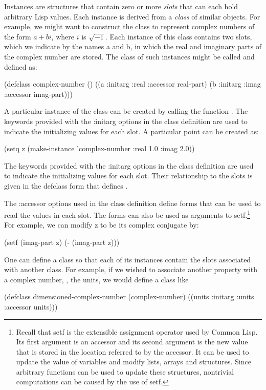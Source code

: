 Instances are structures that contain zero or more {\em slots} that
can each hold arbitrary Lisp values. Each instance is derived from a
{\em class} of similar objects. For example, we might want to
construct the class to represent complex numbers of the form $a + bi$,
where $i$ is $\sqrt{-1}$. Each instance of this class contains two
slots, which we indicate by the names {\sf a} and {\sf b}, in which
the real and imaginary parts of the complex number are stored.  The
class of such instances might be called  and
defined as:
\begin{code}
(defclass complex-number ()
  ((a :initarg :real :accessor real-part)
   (b :initarg :imag :accessor imag-part)))
\end{code}

A particular instance of the class  can be created by
calling the function .  The keywords provided with
the {\sf :initarg} options in the class definition are used to
indicate the initializing values for each slot.  A particular {\sf
point} can be created as:
\begin{code}
(setq z (make-instance 'complex-number :real 1.0 :imag 2.0))
\end{code}

\noindent
The keywords provided with the {\sf :initarg} options in the class
definition are used to indicate the initializing values for each
slot. Their relationship to the slots is given in the {\sf defclass} form
that defines .


The {\sf :accessor} options used in the class definition define forms
that can be used to read the values in each slot.  The forms can also
be used as arguments to {\sf setf}.\footnote{Recall that {\sf setf} is
the extensible assignment operator used by Common Lisp.  Its first
argument is an accessor and its second argument is the new value that
is stored in the location referred to by the accessor.  It can be used
to update the value of variables and modify lists, arrays and
structures.  Since arbitrary functions can be used to update these
structures, nontrivial computations can be caused by the use of {\sf
setf}.}  For example, we can modify {\sf z} to be its complex
conjugate by:
\begin{code}
(setf (imag-part z) (- (imag-part z)))
\end{code}

One can define a class so that each of its instances contain the slots
associated with another class.  For example, if we wished to associate
another property with a complex number, \eg, the units, we would
define a class like
\begin{code}
(defclass dimensioned-complex-number (complex-number)
  ((units :initarg :units :accessor units)))
\end{code}

